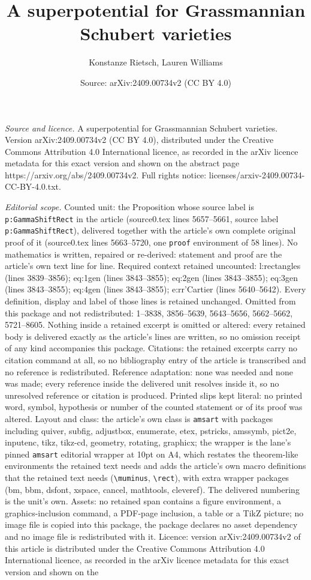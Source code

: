 \documentclass[10pt,a4paper]{amsart}
\title[A superpotential for Grassmannian Schubert varieties]{A superpotential for Grassmannian Schubert varieties}
\author{Konstanze Rietsch, Lauren Williams}
\date{Source: arXiv:2409.00734v2 (CC BY 4.0)}
\begin{document}
\maketitle

\noindent\emph{Source and licence.} A superpotential for Grassmannian Schubert varieties. Version arXiv:2409.00734v2 (CC BY 4.0), distributed under the Creative Commons Attribution 4.0 International licence, as recorded in the arXiv licence metadata for this exact version and shown on the abstract page https://arxiv.org/abs/2409.00734v2. Full rights notice: licenses/arxiv-2409.00734-CC-BY-4.0.txt.\par\smallskip

\noindent\textit{Editorial scope.} Counted unit: the Proposition whose source label is \texttt{p:GammaShiftRect} in the article (source0.tex lines 5657--5661, source label \texttt{p:GammaShiftRect}), delivered together with the article's own complete original proof of it (source0.tex lines 5663--5720, one \texttt{proof} environment of 58 lines). No mathematics is written, repaired or re-derived: statement and proof are the article's own text line for line. Required context retained uncounted: l:rectangles (lines 3839--3856); eq:1gen (lines 3843--3855); eq:2gen (lines 3843--3855); eq:3gen (lines 3843--3855); eq:4gen (lines 3843--3855); e:rr'Cartier (lines 5640--5642). Every definition, display and label of those lines is retained unchanged. Omitted from this package and not redistributed: 1--3838, 3856--5639, 5643--5656, 5662--5662, 5721--8605. Nothing inside a retained excerpt is omitted or altered: every retained body is delivered exactly as the article's lines are written, so no omission receipt of any kind accompanies this package. Citations: the retained excerpts carry no citation command at all, so no bibliography entry of the article is transcribed and no reference is redistributed. Reference adaptation: none was needed and none was made; every reference inside the delivered unit resolves inside it, so no unresolved reference or citation is produced. Printed slips kept literal: no printed word, symbol, hypothesis or number of the counted statement or of its proof was altered. Layout and class: the article's own class is \texttt{amsart} with packages including quiver, subfig, adjustbox, enumerate, etex, pstricks, amssymb, pict2e, inputenc, tikz, tikz-cd, geometry, rotating, graphicx; the wrapper is the lane's pinned \texttt{amsart} editorial wrapper at 10pt on A4, which restates the theorem-like environments the retained text needs and adds the article's own macro definitions that the retained text needs (\texttt{\textbackslash muminus}, \texttt{\textbackslash rect}), with extra wrapper packages (bm, bbm, dsfont, xspace, cancel, mathtools, cleveref). The delivered numbering is the unit's own. Assets: no retained span contains a figure environment, a graphics-inclusion command, a PDF-page inclusion, a table or a TikZ picture; no image file is copied into this package, the package declares no asset dependency and no image file is redistributed with it. Licence: version arXiv:2409.00734v2 of this article is distributed under the Creative Commons Attribution 4.0 International licence, as recorded in the arXiv licence metadata for this exact version and shown on the 
\end{document}
